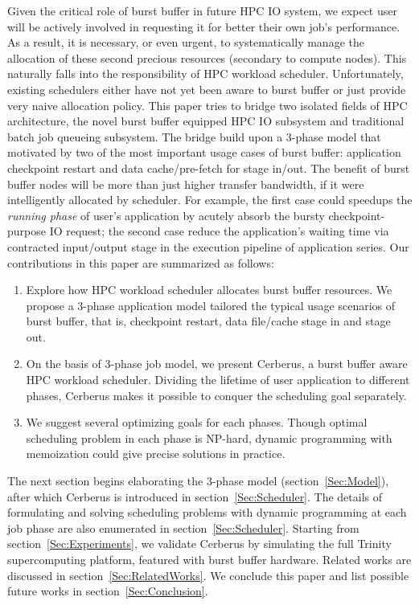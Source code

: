 Given the critical role of burst buffer in future HPC IO system,
we expect user will be actively involved in requesting it for
better their own job's performance.
As a result, it is necessary, or even urgent, to systematically manage
the allocation of these second precious resources (secondary to compute nodes).
This naturally falls into the responsibility of HPC workload scheduler.
Unfortunately, existing schedulers
either have not yet been aware to burst buffer\cite{Moab} %
or just provide very naive allocation policy\cite{SlurmBBGuide}.
This paper tries to bridge two isolated fields of HPC architecture,
the novel burst buffer equipped HPC IO subsystem and
traditional batch job queueing subsystem.
The bridge build upon a 3-phase model that motivated by two of the most
important usage cases of burst buffer:
application checkpoint restart and data cache/pre-fetch for stage in/out.
The benefit of burst buffer nodes will be more than just higher transfer
bandwidth, if it were intelligently allocated by scheduler.
For example, the first case could speedups the \textit{running phase} of
user's application by acutely absorb the bursty checkpoint-purpose IO request;
the second case reduce the application's waiting time via
contracted input/output stage in the execution pipeline of application series.
Our contributions in this paper are summarized as follows:
\begin{enumerate}
        \item Explore how HPC workload scheduler allocates burst buffer resources.
                We propose a 3-phase application model tailored the typical
                usage scenarios of burst buffer, that is, checkpoint restart,
                data file/cache stage in and stage out.
        \item On the basis of 3-phase job model, we present Cerberus,
                a burst buffer aware HPC workload scheduler.
                Dividing the lifetime of user application to different phases,
                Cerberus makes it possible to conquer the scheduling goal separately.
        \item We suggest several optimizing goals for each phases.
                Though optimal scheduling problem in each phase is NP-hard,
                dynamic programming with memoization could give precise solutions
                in practice.
\end{enumerate}

The next section begins elaborating the 3-phase model (section~\ref{Sec:Model}),
after which Cerberus is introduced in section~\ref{Sec:Scheduler}.
The details of formulating and solving scheduling problems with
dynamic programming at each job phase are also
enumerated in section~\ref{Sec:Scheduler}.
Starting from section~\ref{Sec:Experiments}, we validate Cerberus
by simulating the full Trinity supercomputing platform, featured with
burst buffer hardware.
Related works are discussed in section~\ref{Sec:RelatedWorks}.
We conclude this paper and list possible future works in section~\ref{Sec:Conclusion}.





